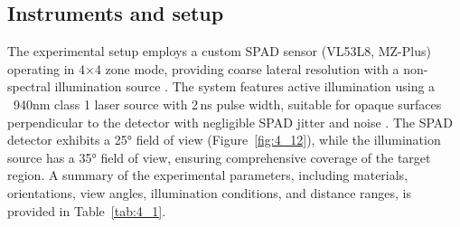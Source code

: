 \documentclass[12pt,a4paper,oneside]{report}
\begin{document}
\subsection{Instruments and setup}
\label{subsec:instruments_setup}

The experimental setup employs a custom SPAD sensor (VL53L8, MZ-Plus) operating in 4×4 zone mode, providing coarse lateral resolution with a non-spectral illumination source \cite{vl53l5cx2022}. The system features active illumination using a ~940nm class 1 laser source with 2\,ns pulse width, suitable for opaque surfaces perpendicular to the detector with negligible SPAD jitter and noise \cite{tontini2020}. The SPAD detector exhibits a 25° field of view (Figure~\ref{fig:4_12}), while the illumination source has a 35° field of view, ensuring comprehensive coverage of the target region. A summary of the experimental parameters, including materials, orientations, view angles, illumination conditions, and distance ranges, is provided in Table~\ref{tab:4_1}.

\begin{table}[H]
\centering
{}
\caption[Summary of experimental parameters for SPAD-based material sensing.]{\textbf{Summary of experimental parameters for SPAD-based material sensing.} Factors controlled during data acquisition for single-pixel and multi-pixel classification experiments.}
\label{tab:4_1}
\end{table}
\end{document}
